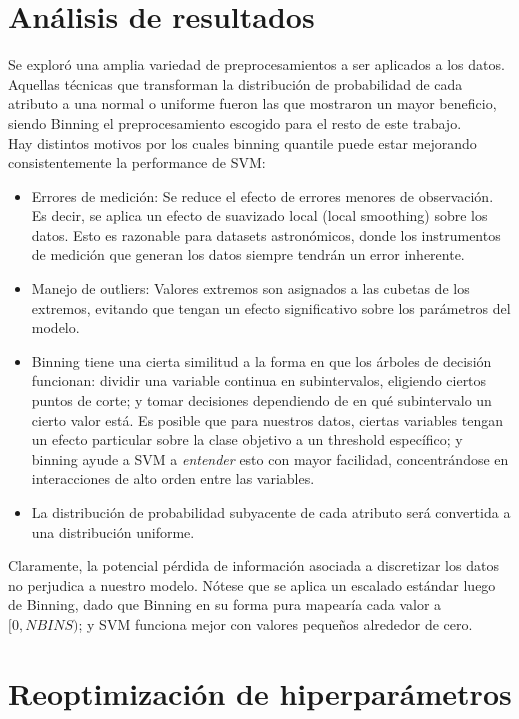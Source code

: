 \section{Análisis de resultados}

Se exploró una amplia variedad de preprocesamientos a ser aplicados a los datos. Aquellas técnicas que transforman la distribución de probabilidad de cada atributo a una normal o uniforme fueron las que mostraron un mayor beneficio, siendo Binning el preprocesamiento escogido para el resto de este trabajo. \\

Hay distintos motivos por los cuales binning quantile puede estar mejorando consistentemente la performance de SVM:

\begin{itemize}
\item Errores de medición: Se reduce el efecto de errores menores de observación. Es decir, se aplica un efecto de suavizado local (local smoothing) sobre los datos. Esto es razonable para datasets astronómicos, donde los instrumentos de medición que generan los datos siempre tendrán un error inherente.
\item Manejo de outliers: Valores extremos son asignados a las cubetas de los extremos, evitando que tengan un efecto significativo sobre los parámetros del modelo.
\item Binning tiene una cierta similitud a la forma en que los árboles de decisión funcionan: dividir una variable continua en subintervalos, eligiendo ciertos puntos de corte; y tomar decisiones dependiendo de en qué subintervalo un cierto valor está. Es posible que para nuestros datos, ciertas variables tengan un efecto particular sobre la clase objetivo a un threshold específico; y binning ayude a SVM a \textit{entender} esto con mayor facilidad, concentrándose en interacciones de alto orden entre las variables.
\item La distribución de probabilidad subyacente de cada atributo será convertida a una distribución uniforme.
\end{itemize} 

Claramente, la potencial pérdida de información asociada a discretizar los datos no perjudica a nuestro modelo. Nótese que se aplica un escalado estándar luego de Binning, dado que Binning en su forma pura mapearía cada valor a $[0,NBINS)$; y SVM funciona mejor con valores pequeños alrededor de cero. \\

\section{Reoptimización de hiperparámetros}

